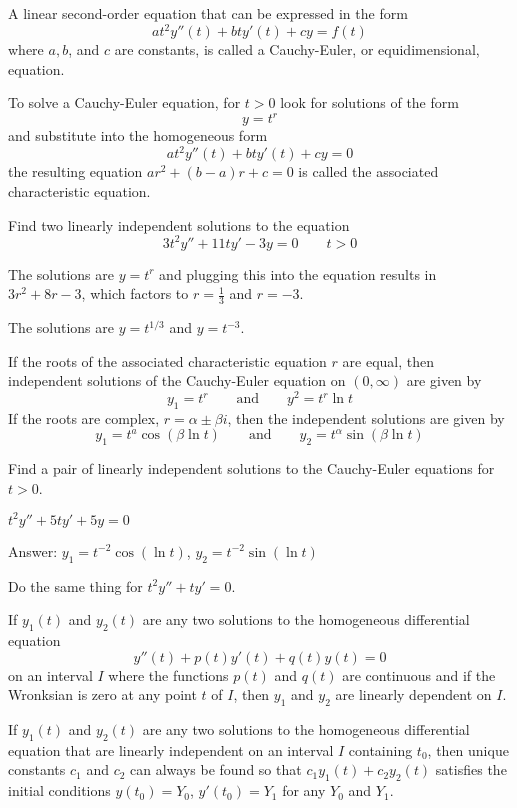 \documentclass[../diffeq.tex]{subfiles}
\begin{document}
\begin{definition}
    A linear second-order equation that can be expressed in the form 
    \[ at^2y''(t)+bty'(t)+cy=f(t) \]
    where $a,b$, and $c$ are constants, is called a Cauchy-Euler, or equidimensional, equation.
\end{definition}

To solve a Cauchy-Euler equation, for $t>0$ look for solutions of the form 
\[ y=t^r \]
and substitute into the homogeneous form 
\[ at^2y''(t)+bty'(t)+cy =0 \]
the resulting equation $ar^2+(b-a)r+c=0$ is called the associated characteristic equation.

\begin{example}
    Find two linearly independent solutions to the equation 
    \[ 3t^2y''+11ty'-3y=0 \qquad t>0 \]

    The solutions are $y=t^r$ and plugging this into the equation results in $3r^2+8r-3$, which factors to $r=\frac{1}{3}$ and $r=-3$.

    The solutions are $y=t^{1/3}$ and $y=t^{-3}$.
\end{example}

If the roots of the associated characteristic equation $r$ are equal, then independent solutions of the Cauchy-Euler equation on $(0, \infty)$ are given by 
\[ y_1 = t^r \qquad \text{and} \qquad y^2 = t^r\ln t\]
If the roots are complex, $r=\alpha\pm\beta i$, then the independent solutions are given by 
\[ y_1=t^a\cos(\beta \ln t) \qquad \text{and} \qquad y_2=t^{\alpha}\sin(\beta \ln t) \]

\begin{example}
    Find a pair of linearly independent solutions to the Cauchy-Euler equations for $t>0$.

    $t^2y''+5ty'+5y=0$

    Answer: $y_1=t^{-2}\cos (\ln t)$, $y_2=t^{-2}\sin(\ln t)$
\end{example}

\ex Do the same thing for $t^2y''+ty'=0$.

\begin{lemma}
    If $y_1(t)$ and $y_2(t)$ are any two solutions to the homogeneous differential equation 
    \[ y''(t)+p(t)y'(t)+q(t)y(t) =0 \]
    on an interval $I$ where the functions $p(t)$ and $q(t)$ are continuous and if the Wronksian is zero at any point $t$ of $I$, then $y_1$ and $y_2$ are linearly dependent on $I$.
\end{lemma}

\begin{theorem}
    If $y_1(t)$ and $y_2(t)$ are any two solutions to the homogeneous differential equation that are linearly independent on an interval $I$ containing $t_0$, then unique constants $c_1$ and $c_2$ can always be found so that $c_1y_1(t)+c_2y_2(t)$ satisfies the initial
    conditions $y(t_0)=Y_0$, $y'(t_0)=Y_1$ for any $Y_0$ and $Y_1$.
\end{theorem}
\end{document}
